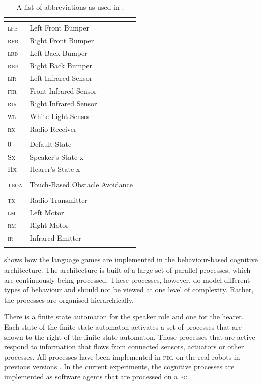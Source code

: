 \begin{table}
\centering
\begin{tabular}{>{\scshape}ll}
\lsptoprule
\multicolumn{2}{c}{{\sc sensors}}\\
\midrule
lfb & Left Front Bumper\\
rfb & Right Front Bumper\\
lbb & Left Back Bumper\\
rbb & Right Back Bumper\\
lir & Left Infrared Sensor\\
fir & Front Infrared Sensor\\
rir & Right Infrared Sensor\\
wl & White Light Sensor\\
rx & Radio Receiver\\
\midrule
\multicolumn{2}{c}{{\sc finite state automata}}\\
\midrule
0 & Default State\\
{\rmfamily Sx} & Speaker's State x\\
{\rmfamily Hx} & Hearer's State x\\
\midrule
\multicolumn{2}{c}{{\sc processes}}\\
\midrule
tboa & Touch-Based Obstacle Avoidance\\
\midrule
\multicolumn{2}{c}{{\sc actuators}}\\
\midrule
tx & Radio Transmitter\\
lm & Left Motor\\
rm & Right Motor\\
ir & Infrared Emitter\\
\lspbottomrule
\end{tabular}
\caption{A list of abbreviations as used in .}
\label{t:abbr}
\end{table}


 shows how the language games are implemented in the behaviour-based cognitive architecture. The architecture is built of a large set of parallel processes, which are continuously being processed. These processes, however, do model different types of behaviour and should not be viewed at one level of complexity. Rather, the processes are organised hierarchically. 

There is a finite state automaton for the speaker role and one for the hearer. Each state of the finite state automaton activates a set of processes that are shown to the right of the finite state automaton. Those processes that are active respond to information that flows from connected sensors, actuators or other processes. All processes have been implemented in {\scshape pdl} on the real robots in previous versions \citep{steelsvogt:1997}. In the current experiments, the cognitive processes are implemented as software agents that are processed on a {\scshape pc}.

